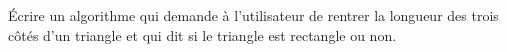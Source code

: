 
\begin{exercice}\label{exosmath-0585}

    Écrire un algorithme qui demande à l'utilisateur de rentrer la longueur des trois côtés d'un triangle et qui dit si le triangle est rectangle ou non.

\end{exercice}
